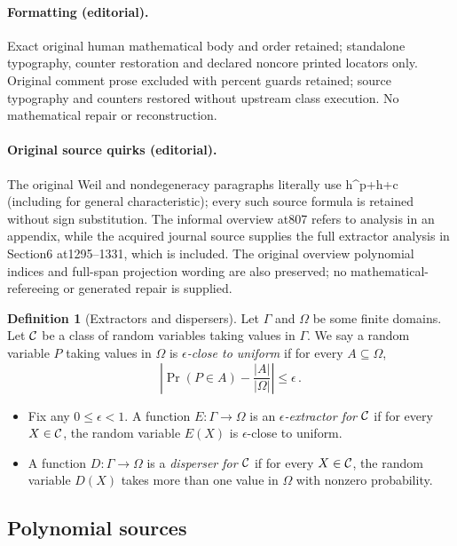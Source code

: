 \documentclass[10pt]{article}
\theoremstyle{definition}
\newtheorem{definition}[theorem]{Definition}
\numberwithin{equation}{section}
\newcommand{\eps}{\epsilon}
\begin{document}
\paragraph{Formatting (editorial).} Exact original human mathematical body and order retained; standalone typography, counter restoration and declared noncore printed locators only. Original comment prose excluded with percent guards retained; source typography and counters restored without upstream class execution. No mathematical repair or reconstruction.
\paragraph{Original source quirks (editorial).} The original Weil and nondegeneracy paragraphs literally use h\textasciicircum{}p+h+c (including for general characteristic); every such source formula is retained without sign substitution. The informal overview at807 refers to analysis in an appendix, while the acquired journal source supplies the full extractor analysis in Section6 at1295–1331, which is included. The original overview polynomial indices and full-span projection wording are also preserved; no mathematical-refereeing or generated repair is supplied.
\endgroup
\clearpage
\setcounter{section}{1}\setcounter{theorem}{0}
\begin{definition}[Extractors and dispersers]
Let $\Gamma$ and $\Omega$ be some finite domains.
Let ${\cal C}$ be a class of random variables taking values in  $\Gamma$.
We say a random variable $P$ taking values in $\Omega$ is
\emph{$\eps$-close to uniform} if for every  $A\subseteq \Omega$,
%
%
\[\left|\Pr (P \in A) - \frac{|A|}{|\Omega|}\right| \leq \eps\,.\]
\begin{itemize}
%
%
%
%
\item Fix any $0\leq \eps <1$. A function $E:\Gamma \to\Omega$
is an \emph{$\eps$-extractor for ${\cal C}$}
if for every $X \in {\cal C}$,
the random variable %
$E(X)$ is $\eps$-close to %
uniform.
%
%
\item A function $D:\Gamma \to\Omega$ is
%
a \emph{disperser for ${\cal C}$} if for every $X \in {\cal C}$,
the random variable %
$D(X)$ takes more than %
one value in $\Omega$ with nonzero probability.
\end{itemize}
\end{definition}
\subsection{Polynomial sources}
\end{document}
